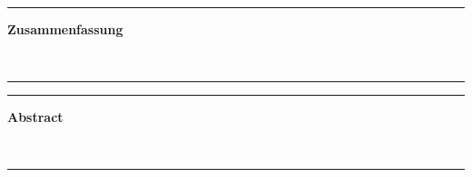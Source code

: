 \vfill
{\color{thillux-grey}\hrule}
\begin{center}
\large\sffamily\textbf{Zusammenfassung}
\end{center}
\blindtext\\[1em]
{\color{thillux-grey}\hrule}
\vfill

{\color{thillux-grey}\hrule}
\begin{center}
\large\sffamily\textbf{Abstract}
\end{center}
\blindtext\\[1em]
{\color{thillux-grey}\hrule}
